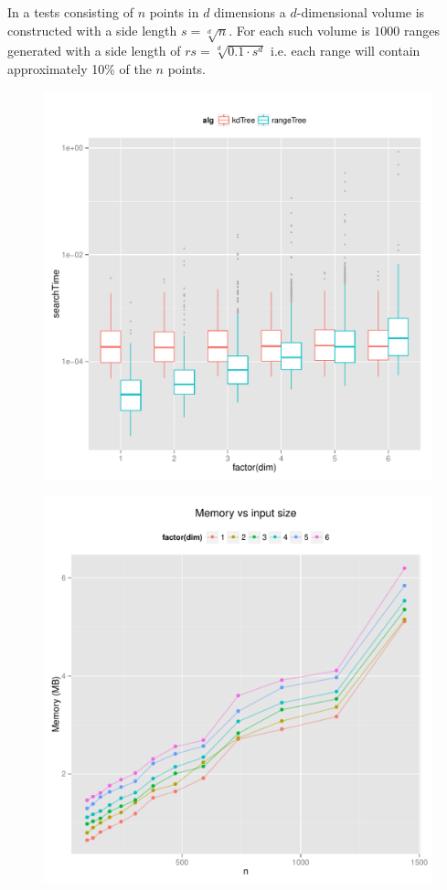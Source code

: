 \documentclass{article}
\begin{document}
    In a tests consisting of $n$ points in $d$ dimensions a $d$-dimensional 
    volume is constructed with a side length $s = \sqrt[d]{n}$. For each such 
    volume is $1000$ ranges generated with a side length of 
    $rs = \sqrt[d]{0.1 \cdot s^d}$ i.e. each range will contain approximately 
    10\% of the $n$ points. 
\begin{figure}[H]
    \centering
    \includegraphics[width=\textwidth]{../src/R/plots/boxplot.pdf}
\end{figure}
\begin{figure}[H]
    \centering
    \includegraphics[width=\textwidth]{../src/R/plots/kdmem.pdf}
\end{figure}
\end{document}
